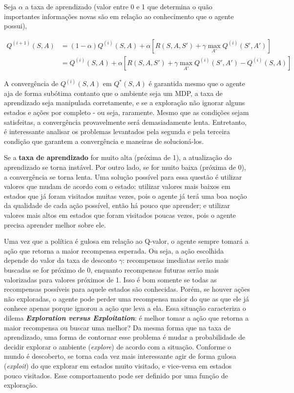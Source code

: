 Seja $\alpha$ a taxa de aprendizado (valor entre 0 e 1 que determina o quão importantes informações novas são em relação ao conhecimento que o agente possui),

\begin{equation} \label{eq:q_update}
\begin{align*}
Q^{(i+1)}(S,A) &= (1-\alpha)Q^{(i)}(S,A) + \alpha[R(S,A,S') + \gamma \max_{A'}Q^{(i)}(S',A')] \\
            &= Q^{(i)}(S,A) + \alpha[R(S,A,S') + \gamma \max_{A'}Q^{(i)}(S',A') - Q^{(i)}(S,A)]
\end{align*}
\end{equation}

A convergência de $Q^{(i)}(S,A)$ em $Q^{*}(S,A)$ é garantida mesmo que o agente aja de forma subótima contanto que o ambiente seja um MDP, a taxa de aprendizado seja manipulada corretamente, e se a exploração não ignorar alguns estados e ações por completo - ou seja, raramente.
Mesmo que as condições sejam satisfeitas, a convergência provavelmente será demasiadamente lenta.
Entretanto, é interessante analisar os problemas levantados pela segunda e pela terceira condição que garantem a convergência e maneiras de solucioná-los.

Se a \textbf{taxa de aprendizado} for muito alta (próxima de 1), a atualização do aprendizado se torna instável.
Por outro lado, se for muito baixa (próxima de 0), a convergência se torna lenta.
Uma solução possível para essa questão é utilizar valores que mudam de acordo com o estado: utilizar valores mais baixos em estados que já foram visitados muitas vezes, pois o agente já terá uma boa noção da qualidade de cada ação possível, então há pouco que aprender; e utilizar valores mais altos em estados que foram visitados poucas vezes, pois o agente precisa aprender melhor sobre ele.

Uma vez que a política é gulosa em relação ao Q-valor, o agente sempre tomará a ação que retorna a maior recompensa esperada.
Ou seja, a ação escolhida depende do valor da taxa de desconto $\gamma$: recompensas imediatas serão mais buscadas se for próximo de 0, enquanto recompensas futuras serão mais valorizadas para valores próximos de 1.
Isso é bom somente se todas as recompensas possíveis para aquele estados são conhecidas.
Porém, se houver ações não exploradas, o agente pode perder uma recompensa maior do que as que ele já conhece apenas porque ignorou a ação que leva a ela.
Essa situação caracteriza o dilema \textbf{\textit{Exploration versus Exploitation}}: é melhor tomar a ação que retorna a maior recompensa ou buscar uma melhor?
Da mesma forma que na taxa de aprendizado, uma forma de contornar esse problema é mudar a probabilidade de decidir explorar o ambiente (\textit{explore}) de acordo com a situação.
Conforme o mundo é descoberto, se torna cada vez mais interessante agir de forma gulosa (\textit{exploit}) do que explorar em estados muito visitado, e vice-versa em estados pouco visitados.
Esse comportamento pode ser definido por uma função de exploração.

